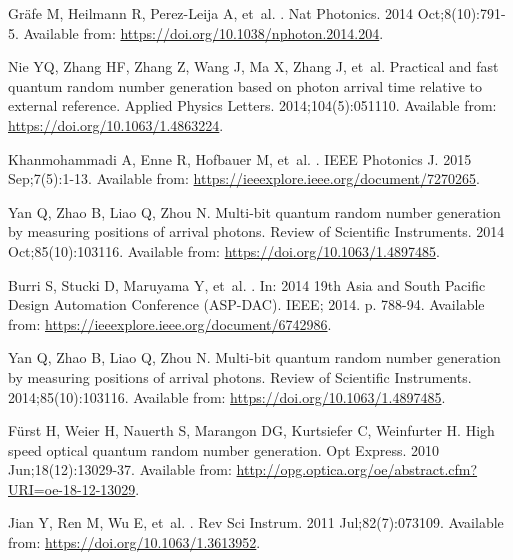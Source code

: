 \documentclass[]{interact}
\theoremstyle{plain}%
\theoremstyle{definition}
\theoremstyle{remark}
\begin{document}
\begin{thebibliography}{100}
Gr{\ifmmode{}\else\"{a}\fi}fe M, Heilmann R, Perez-Leija A, et~al.
.
\newblock Nat Photonics. 2014 Oct;8(10):791-5.
\newblock Available from: \url{https://doi.org/10.1038/nphoton.2014.204}.

Nie YQ, Zhang HF, Zhang Z, Wang J, Ma X, Zhang J, et~al.
\newblock Practical and fast quantum random number generation based on photon
  arrival time relative to external reference.
\newblock Applied Physics Letters. 2014;104(5):051110.
\newblock Available from: \url{https://doi.org/10.1063/1.4863224}.

Khanmohammadi A, Enne R, Hofbauer M, et~al.
.
\newblock IEEE Photonics J. 2015 Sep;7(5):1-13.
\newblock Available from: \url{https://ieeexplore.ieee.org/document/7270265}.

Yan Q, Zhao B, Liao Q, Zhou N.
\newblock Multi-bit quantum random number generation by measuring positions of
  arrival photons.
\newblock Review of Scientific Instruments. 2014 Oct;85(10):103116.
\newblock Available from: \url{https://doi.org/10.1063/1.4897485}.

Burri S, Stucki D, Maruyama Y, et~al.
.
\newblock In: {2014 19th Asia and South Pacific Design Automation Conference
  (ASP-DAC)}. IEEE; 2014. p. 788-94.
\newblock Available from: \url{https://ieeexplore.ieee.org/document/6742986}.

Yan Q, Zhao B, Liao Q, Zhou N.
\newblock Multi-bit quantum random number generation by measuring positions of
  arrival photons.
\newblock Review of Scientific Instruments. 2014;85(10):103116.
\newblock Available from: \url{https://doi.org/10.1063/1.4897485}.

F\"{u}rst H, Weier H, Nauerth S, Marangon DG, Kurtsiefer C, Weinfurter H.
\newblock High speed optical quantum random number generation.
\newblock Opt Express. 2010 Jun;18(12):13029-37.
\newblock Available from:
  \url{http://opg.optica.org/oe/abstract.cfm?URI=oe-18-12-13029}.

Jian Y, Ren M, Wu E, et~al.
.
\newblock Rev Sci Instrum. 2011 Jul;82(7):073109.
\newblock Available from: \url{https://doi.org/10.1063/1.3613952}.


\end{thebibliography}
\end{document}

